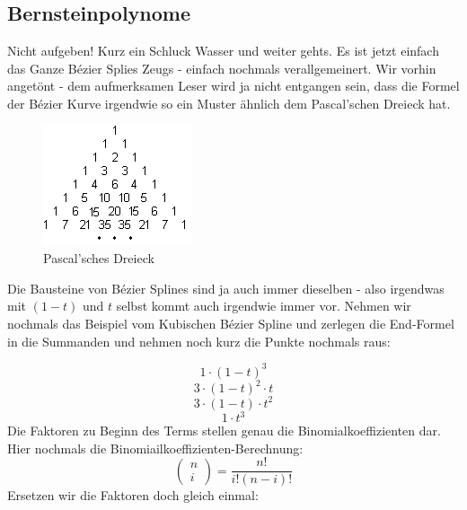 \subsection{Bernsteinpolynome}
Nicht aufgeben! Kurz ein Schluck Wasser und weiter gehts. Es ist jetzt einfach das Ganze Bézier Splies Zeugs - einfach nochmals verallgemeinert. Wir vorhin angetönt - dem aufmerksamen Leser wird ja nicht entgangen sein, dass die Formel der Bézier Kurve irgendwie so ein Muster ähnlich dem Pascal'schen Dreieck hat.
\begin{figure}[!ht]
	\centering
	\includegraphics[width=0.2\linewidth]{fig/pascalsches_dreieck}
	\caption{Pascal'sches Dreieck}
	\label{fig:pascalsches_dreieck}
\end{figure}
Die Bausteine von Bézier Splines sind ja auch immer dieselben - also irgendwas mit \((1-t)\) und \(t\) selbst kommt auch irgendwie immer vor. Nehmen wir nochmals das Beispiel vom Kubischen Bézier Spline und zerlegen die End-Formel in die Summanden und nehmen noch kurz die Punkte nochmals raus:

\begin{displaymath}
1\cdot (1-t)^3
\end{displaymath}
\begin{displaymath}
3\cdot (1-t)^2\cdot t
\end{displaymath}
\begin{displaymath}
3\cdot (1-t)\cdot t^2
\end{displaymath}
\begin{displaymath}
1\cdot t^3
\end{displaymath}
Die Faktoren zu Beginn des Terms stellen genau die Binomialkoeffizienten dar. Hier nochmals die Binomiailkoeffizienten-Berechnung:
\begin{displaymath}
\begin{pmatrix}
n \\ i
\end{pmatrix}
= \frac{n!}{i!(n-i)!}
\end{displaymath}
Ersetzen wir die Faktoren doch gleich einmal:

